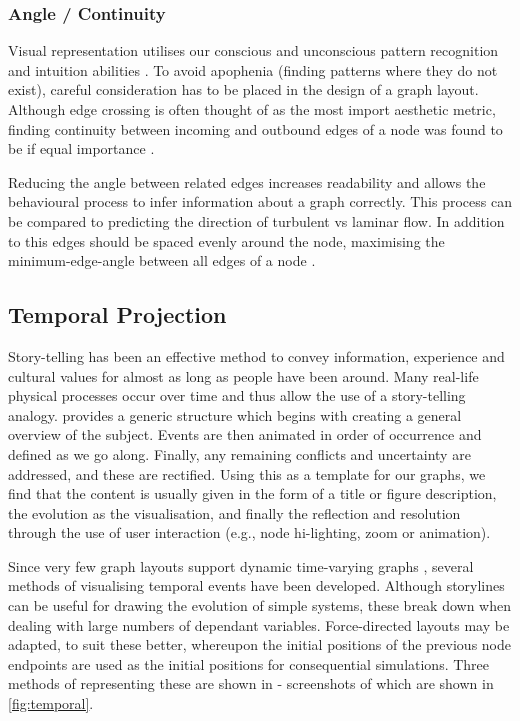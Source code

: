 \subsubsection{ Angle / Continuity}
Visual representation utilises our conscious and unconscious pattern recognition and intuition abilities \citep{pattern}. To avoid apophenia (finding patterns where they do not exist), careful consideration has to be placed in the design of a graph layout. 
Although edge crossing is often thought of as the most import aesthetic metric, finding continuity between incoming and outbound edges of a node was found to be if equal importance \citep{continuity}.

Reducing the angle between related edges increases readability and allows the behavioural process to infer information about a graph correctly. This process can be compared to predicting the direction of turbulent vs laminar flow. In addition to this edges should be spaced evenly around the node, maximising the minimum-edge-angle between all edges of a node \citep{aestheticsgraphvis}. 



\subsection{Temporal Projection}
Story-telling has been an effective method to convey information, experience and cultural values for almost as long as people have been around. Many real-life physical processes occur over time and thus allow the use of a story-telling analogy. \cite{storytelling} provides a generic structure which begins with creating a general overview of the subject. Events are then animated in order of occurrence and defined as we go along. Finally, any remaining conflicts and uncertainty are addressed, and these are rectified.  
Using this as a template for our graphs, we find that the content is usually given in the form of a title or figure description, the evolution as the visualisation, and finally the reflection and resolution through the use of user interaction (e.g., node hi-lighting, zoom or animation).

Since very few graph layouts support dynamic time-varying graphs \citep{tvg}, several methods of visualising temporal events have been developed. 
Although storylines can be useful for drawing the evolution of simple systems, these break down when dealing with large numbers of dependant variables. Force-directed layouts may be adapted, to suit these better, whereupon the initial positions of the previous node endpoints are used as the initial positions for consequential simulations. Three methods of representing these are shown in \citep{daygraph} - screenshots of which are shown in \autoref{fig:temporal}.


